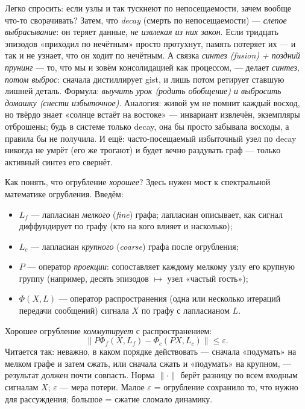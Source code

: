 \begin{intuition}
Легко спросить: если узлы и так тускнеют по непосещаемости, зачем вообще
что-то сворачивать? Затем, что \emph{decay} (смерть по непосещаемости) ---
\emph{слепое выбрасывание}: он теряет данные, \emph{не извлекая из них закон}.
Если тридцать эпизодов «приходил по нечётным» просто протухнут, память
потеряет их --- и так и не узнает, что он ходит по нечётным. А связка
\emph{синтез (fusion) + поздний прунинг} --- то, что мы и зовём
консолидацией как процессом, --- делает \emph{синтез, потом выброс}: сначала
дистиллирует gist, и лишь потом ретирует ставшую лишней деталь. Формула:
\emph{выучить урок (родить обобщение) и выбросить домашку (снести избыточное)}.
Аналогия: живой ум не помнит каждый восход, но твёрдо знает «солнце встаёт
на востоке» --- инвариант извлечён, экземпляры отброшены; будь в системе
только decay, она бы просто забывала восходы, а правила бы не получила. И
ещё: часто-посещаемый избыточный узел по decay никогда не умрёт (его же
трогают) и будет вечно раздувать граф --- только активный синтез его
свернёт.
\end{intuition}

Как понять, что огрубление \emph{хорошее}? Здесь нужен мост к спектральной
математике огрубления. Введём:
\begin{itemize}
\item $L_f$ --- лапласиан \emph{мелкого} (\textit{fine}) графа; лапласиан
описывает, как сигнал диффундирует по графу (кто на кого влияет и насколько);
\item $L_c$ --- лапласиан \emph{крупного} (\textit{coarse}) графа после
огрубления;
\item $P$ --- оператор \emph{проекции}: сопоставляет каждому мелкому узлу его
крупную группу (например, десять эпизодов $\mapsto$ узел «частый гость»);
\item $\Phi(X,L)$ --- оператор распространения (одна или несколько итераций
передачи сообщений) сигнала $X$ по графу с лапласианом $L$.
\end{itemize}

Хорошее огрубление \emph{коммутирует} с распространением:
\begin{equation}
\left\| P\Phi_f(X,L_f) - \Phi_c(PX,L_c) \right\| \le \varepsilon.
\label{eq:commute}
\end{equation}
Читается так: неважно, в каком порядке действовать --- сначала «подумать» на
мелком графе и затем сжать, или сначала сжать и «подумать» на крупном, ---
результат должен почти совпасть. Норма $\|\cdot\|$ берёт разницу по всем
входным сигналам $X$; $\varepsilon$ --- мера потери. Малое $\varepsilon$ =
огрубление сохранило то, что нужно для рассуждения; большое = сжатие
сломало динамику.

